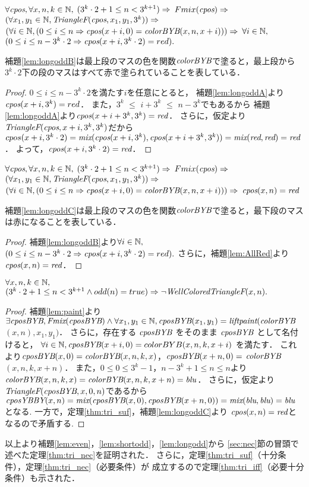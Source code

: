 \begin{lem}[\LongOddB] \label{lem:longoddB}
  $\forall \textit{cpos}, \forall x, n, k \in \mathbb{N},$
  $(3^k \cdot 2 + 1 \leq n < 3^{k+1}) \Rightarrow$
  $Fmix(\textit{cpos}) \Rightarrow $
  $(\forall x_1, y_1 \in \mathbb{N}, \textit{TriangleF}(\textit{cpos},x_1,y_1,3^k)) \Rightarrow$
  $(\forall i \in \mathbb{N}, (0 \leq i \leq n \Rightarrow \textit{cpos}(x+i,0) = \textit{colorBYB}(x,n,x+i))) \Rightarrow$
  $\forall i \in \mathbb{N},$ $(0 \leq i \leq n - 3^k \cdot 2 \Rightarrow \textit{cpos}(x+i,3^k \cdot 2) = red).$
\end{lem}
補題\ref{lem:longoddB}は最上段のマスの色を関数$\textit{colorBYB}$で塗ると，最上段から$3^k\cdot2$下の段のマスはすべて赤で塗られていることを表している．
\begin{proof}
  $0 \leq i \leq n - 3^k \cdot 2$を満たす$i$を任意にとると，
  補題\ref{lem:longoddA}より$\textit{cpos}(x+i,3^k) = red$．
  また，$3^k$ $\leq$ $i+3^k$ $\leq$ $n - 3^k$でもあるから
  補題\ref{lem:longoddA}より$\textit{cpos}(x+i+3^k,3^k) =\textit{red}$．
  さらに，仮定より$\textit{TriangleF}(\textit{cpos},x+i,3^k,3^k)$だから
  $cpos(x+i,3^k \cdot 2)=\textit{mix}(\textit{cpos}(x+i,3^k),\textit{cpos}(x+i+3^k,3^k))=\textit{mix}(\textit{red},\textit{red})=\textit{red}$．
  よって，$\textit{cpos}(x+i,3^k \cdot 2)=\textit{red}$．
\end{proof}

\begin{lem}[\LongOddC] \label{lem:longoddC}
  $\forall \textit{cpos}, \forall x, n, k \in \mathbb{N},$
  $(3^k \cdot 2 + 1 \leq n < 3^{k+1}) \Rightarrow$
  $Fmix(\textit{cpos}) \Rightarrow $
  $(\forall x_1, y_1 \in \mathbb{N}, \textit{TriangleF}(\textit{cpos},x_1,y_1,3^k)) \Rightarrow$
  $(\forall i \in \mathbb{N}, (0 \leq i \leq n \Rightarrow \textit{cpos}(x+i,0) = \textit{colorBYB}(x,n,x+i))) \Rightarrow$
  $\textit{cpos}(x,n) = \textit{red}$
\end{lem}
補題\ref{lem:longoddC}は最上段のマスの色を関数$\textit{colorBYB}$で塗ると，最下段のマスは赤になることを表している．
\begin{proof}
  補題\ref{lem:longoddB}より$\forall i \in \mathbb{N},$ $(0 \leq i \leq n - 3^k \cdot 2 \Rightarrow \textit{cpos}(x+i,3^k \cdot 2) = red).$
  さらに，補題\ref{lem:AllRed}より$\textit{cpos}(x,n)=\textit{red}$．
\end{proof}
\begin{lem}[\LongOdd] \label{lem:longodd}
  $\forall x, n, k \in \mathbb{N},$
  $(3^k\cdot2 + 1 \leq n < 3^{k+1} \land odd(n) = true) \Rightarrow \lnot\textit{WellColoredTriangleF}(x,n).$
\end{lem}
\begin{proof}
  補題\ref{lem:paint}より
  $\exists \textit{cposBYB}, \textit{Fmix}(\textit{cposBYB}) \land \forall x_1, y_1 \in \mathbb{N}, \textit{cposBYB}(x_1,y_1) = \textit{liftpaint}(\textit{colorBYB}$ $(x,n),x_1,y_1)$．
  さらに，存在する $\textit{cposBYB}$ をそのまま $\textit{cposBYB}$ として名付けると，
  $\forall i \in \mathbb{N}, \textit{cposBYB}(x+i,0) = colorBYB(x,n,k,x+i)$ を満たす．
  これより$\textit{cposBYB}(x,0) = \textit{colorBYB}(x,n,k,x)$，$\textit{cposBYB}(x+n,0) = $
  $\textit{colorBYB}$ $(x,n,k,x+n)$．
  また，$0 \leq 0 \leq 3^k-1$，$n-3^k+1 \leq n \leq n$より
  $\textit{colorBYB}(x,n,k,x)=\textit{colorBYB}(x,n,k,x+n)=\textit{blu}$．
  さらに，仮定より$\textit{TriangleF}(\textit{cposBYB},x,0,n)$であるから
  $\textit{cposYBBY}(x,n)=\textit{mix}(\textit{cposBYB}(x,0),\textit{cposBYB}(x+n,0))=\textit{mix}(\textit{blu},\textit{blu})=\textit{blu}$
  となる.
  一方で，定理\ref{thm:tri_suf}，補題\ref{lem:longoddC}より
  $\textit{cpos}(x,n)=\textit{red}$となるので矛盾する.
\end{proof}

以上より補題\ref{lem:even}，\ref{lem:shortodd}，\ref{lem:longodd}から
\ref{sec:nec}節の冒頭で述べた定理\ref{thm:tri_nec}を証明された．
さらに，定理\ref{thm:tri_suf}（十分条件），定理\ref{thm:tri_nec}（必要条件）が
成立するので定理\ref{thm:tri_iff}（必要十分条件）も示された．
